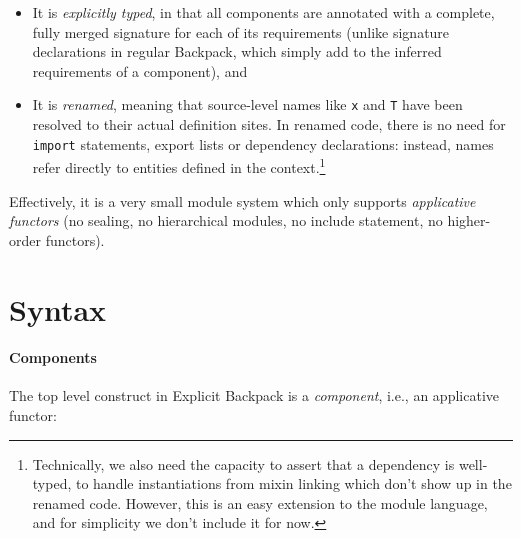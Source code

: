 \documentclass{article}
\begin{document}
\begin{itemize}
    \item It is \emph{explicitly typed}, in that all components are
    annotated with a complete, fully merged signature for each of
    its requirements (unlike \textsf{signature} declarations in
    regular Backpack, which simply add to the inferred requirements
    of a component), and
    \item It is \emph{renamed}, meaning that source-level names like
    \texttt{x} and \texttt{T} have been resolved to their actual
    definition sites.  In renamed code, there is no need for \texttt{import}
    statements, export lists
    or \textsf{dependency} declarations: instead, names refer directly
    to entities defined in the context.\footnote{Technically, we also
    need the capacity to assert that a dependency is well-typed, to
    handle instantiations from mixin linking which don't show up in
    the renamed code.  However, this is an easy extension to the
    module language, and for simplicity we don't include it for now.}
\end{itemize}

\noindent
Effectively, it is a very small module system which only supports
\emph{applicative functors} (no sealing, no hierarchical modules, no
\textsf{include} statement, no higher-order functors).

\section{Syntax}

\paragraph{Components}
The top level construct in Explicit Backpack is a \emph{component},
i.e., an applicative functor:
\end{document}
